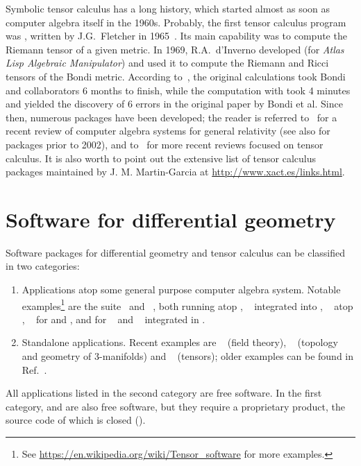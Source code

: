 Symbolic tensor calculus has a long history, which started
almost as soon as computer algebra itself in the 1960s.
Probably, the first tensor calculus program was , written by J.G.~Fletcher
in 1965~\cite{Fletc67}. Its main capability was to compute the Riemann tensor
of a given metric. In 1969, R.A.~d'Inverno developed 
(for \emph{Atlas Lisp Algebraic Manipulator}) and used it to compute
the Riemann and Ricci tensors of the Bondi metric.
According to~\cite{Skea94},
the original calculations took Bondi and collaborators 6 months to finish,
while the computation with  took 4 minutes and yielded the
discovery of 6 errors in the original paper by Bondi et al.
Since then, numerous packages have been developed; the reader is referred to~\cite{MacCa18}
for a recent review of computer algebra
systems for general relativity (see also \cite{MacCa02} for packages prior to 2002), and to~\cite{KorolKS13,BirkaGSC17} for more recent reviews
focused on tensor calculus.
It is also worth to point out the extensive list of
tensor calculus packages maintained by J. M. Martin-Garcia at
\url{http://www.xact.es/links.html}.


\section{Software for differential geometry}

Software packages for differential geometry and tensor calculus can be
classified in two categories:
\begin{enumerate}
\item Applications atop some general purpose computer algebra system.
Notable examples\footnote{See \url{https://en.wikipedia.org/wiki/Tensor_software}
for more examples.} are
the  suite~\cite{Marti08} and ~\cite{ricci}, both
running atop ,
~\cite{AnderT12} integrated into ,
~\cite{grtensorIII} atop , ~\cite{atlas2}
for  and ,  and  for ~\cite{Toth05}
and
~\cite{sagemanifolds} integrated in .
\item Standalone applications. Recent examples are ~\cite{Peete07} (field theory),
~\cite{snappy} (topology and geometry of 3-manifolds)  and
~\cite{BolotP13} (tensors); older examples can be found in
Ref.~\cite{MacCa02}.
\end{enumerate}
All applications listed in the second category are free software. In
the first category,  and  are also free software, but
they require a proprietary product, the source code of which is closed ().

